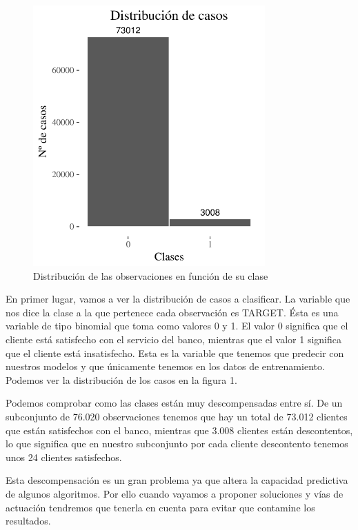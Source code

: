 \documentclass[11pt,a4paper,spanish]{article} %
\begin{document}
  

\begin{figure}[h!]
	\begin{center}
	\includegraphics[width=3.5in]{Z_01_01_Dist_casos.pdf}
    \caption{Distribución de las observaciones en función de su clase}
    \end{center}
\end{figure}

En primer lugar, vamos a ver la distribución de casos a clasificar. La variable que nos dice la clase a la que pertenece cada observación es TARGET. Ésta es una variable de tipo binomial que toma como valores 0 y 1. El valor 0 significa que el cliente está satisfecho con el servicio del banco, mientras que el valor 1 significa que el cliente está insatisfecho. Esta es la variable que tenemos que predecir con nuestros modelos y que únicamente tenemos en los datos de entrenamiento. Podemos ver la distribución de los casos en la figura 1.

\vspace{0.5cm}

Podemos comprobar como las clases están muy descompensadas entre sí. De un subconjunto de 76.020 observaciones tenemos que hay un total de 73.012 clientes que están satisfechos con el banco, mientras que 3.008 clientes están descontentos, lo que significa que en nuestro subconjunto por cada cliente descontento tenemos unos 24 clientes satisfechos. 

\vspace{0.5cm}

Esta descompensación es un gran problema ya que altera la capacidad predictiva de algunos algoritmos. Por ello cuando vayamos a proponer soluciones y vías de actuación tendremos que tenerla en cuenta para evitar que contamine los resultados.
\end{document}
